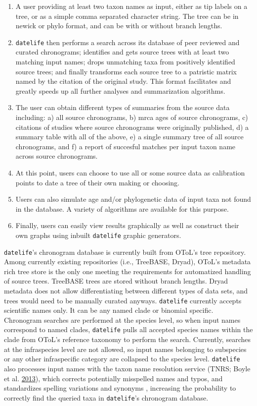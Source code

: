 \documentclass[]{article}
\providecommand{\tightlist}{%
  \setlength{\itemsep}{0pt}\setlength{\parskip}{0pt}}
\begin{document}
\begin{enumerate}
\def\labelenumi{\arabic{enumi})}
\tightlist
\item
  A user providing at least two taxon names as input, either as tip labels on a tree, or as a simple comma separated character string. The tree can be in newick or phylo format, and can be with or without branch lengths.
\item
  \texttt{datelife} then performs a search across its database of peer reviewed and curated chronograms; identifies and gets source trees with at least two matching input names; drops unmatching taxa from positively identified source trees; and finally transforms each source tree to a patristic matrix named by the citation of the original study. This format facilitates and greatly speeds up all further analyses and summarization algorithms.
\item
  The user can obtain different types of summaries from the source data including: a) all source chronograms, b) mrca ages of source chronograms, c) citations of studies where source chronograms were originally published, d) a summary table with all of the above, e) a single summary tree of all source chronograms, and f) a report of succesful matches per input taxon name across source chronograms.
\item
  At this point, users can choose to use all or some source data as calibration points to date a tree of their own making or choosing. 
\item
  Users can also simulate age and/or phylogenetic data of input taxa not found in the database. A variety of algorithms are available for this purpose.
\item
  Finally, users can easily view results graphically as well as construct their own graphs using inbuilt \texttt{datelife} graphic generators.
\end{enumerate}

\texttt{datelife}'s chronogram database is currently built from OToL's
tree repository. Among currently existing repositories (i.e., TreeBASE,
Dryad), OToL's metadata rich tree store is the only one meeting the requirements
for automatized handling of source trees. TreeBASE trees are stored without branch lengths. Dryad metadata does not allow differentiating between different types of data sets, and trees would need to be manually curated anyways.
\texttt{datelife} currently accepts scientific names only. It can be any named clade or binomial specific.
Chronogram searches are performed at the species level, so when input names correspond
to named clades, \texttt{datelife} pulls all accepted species names within the
clade from OToL's reference taxonomy to perform the search.
Currently, searches at the infraspecies level are not allowed, so input names belonging to subspecies or any other infraspecific category are collapsed to the species level.
\texttt{datelife} also processes input names with the taxon name resolution service (TNRS; Boyle et al. \protect\hyperlink{ref-Boyle2013}{2013}),
which corrects potentially misspelled names and typos, and standardizes spelling
variations and synonyms , increasing the probability to correctly find the
queried taxa in \texttt{datelife}'s chronogram database.
\end{document}
